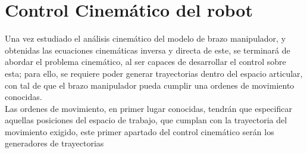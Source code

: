 \section{Control Cinemático del robot}
Una vez estudiado el análisis cinemático del modelo de brazo manipulador, y obtenidas las ecuaciones cinemáticas inversa
y directa de este, se terminará de abordar el problema cinemático, al ser capaces de desarrollar el control sobre esta; para ello,
se requiere poder generar trayectorias dentro del espacio articular, con tal de que el brazo manipulador pueda cumplir una ordenes de
movimiento conocidas.\\

Las ordenes de movimiento, en primer lugar conocidas, tendrán que especificar aquellas posiciones del espacio de trabajo,
que cumplan con la trayectoria del movimiento exigido, este primer apartado del control cinemático serán los generadores de trayectorias




